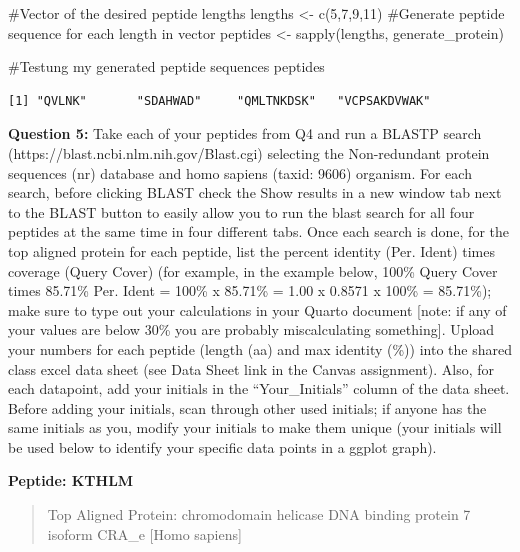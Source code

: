 \documentclass[
  letterpaper,
  DIV=11,
  numbers=noendperiod]{scrartcl}
\newenvironment{Shaded}{\begin{snugshade}}{\end{snugshade}}
\newcommand{\CommentTok}[1]{\textcolor[rgb]{0.37,0.37,0.37}{#1}}
\newcommand{\DecValTok}[1]{\textcolor[rgb]{0.68,0.00,0.00}{#1}}
\newcommand{\FunctionTok}[1]{\textcolor[rgb]{0.28,0.35,0.67}{#1}}
\newcommand{\NormalTok}[1]{\textcolor[rgb]{0.00,0.23,0.31}{#1}}
\newcommand{\OtherTok}[1]{\textcolor[rgb]{0.00,0.23,0.31}{#1}}
\begin{document}
\begin{Shaded}
\begin{Highlighting}[]
\CommentTok{\#Vector of the desired peptide lengths }
\NormalTok{lengths }\OtherTok{\textless{}{-}} \FunctionTok{c}\NormalTok{(}\DecValTok{5}\NormalTok{,}\DecValTok{7}\NormalTok{,}\DecValTok{9}\NormalTok{,}\DecValTok{11}\NormalTok{)}
\CommentTok{\#Generate peptide sequence for each length in vector}
\NormalTok{peptides }\OtherTok{\textless{}{-}} \FunctionTok{sapply}\NormalTok{(lengths, generate\_protein)}

\CommentTok{\#Testung my generated peptide sequences}
\NormalTok{peptides}
\end{Highlighting}
\end{Shaded}

\begin{verbatim}
[1] "QVLNK"       "SDAHWAD"     "QMLTNKDSK"   "VCPSAKDVWAK"
\end{verbatim}

\textbf{Question 5:} Take each of your peptides from Q4 and run a BLASTP
search (https://blast.ncbi.nlm.nih.gov/Blast.cgi) selecting the
Non-redundant protein sequences (nr) database and homo sapiens (taxid:
9606) organism. For each search, before clicking BLAST check the Show
results in a new window tab next to the BLAST button to easily allow you
to run the blast search for all four peptides at the same time in four
different tabs. Once each search is done, for the top aligned protein
for each peptide, list the percent identity (Per. Ident) times coverage
(Query Cover) (for example, in the example below, 100\% Query Cover
times 85.71\% Per. Ident = 100\% x 85.71\% = 1.00 x 0.8571 x 100\% =
85.71\%); make sure to type out your calculations in your Quarto
document {[}note: if any of your values are below 30\% you are probably
miscalculating something{]}. Upload your numbers for each peptide
(length (aa) and max identity (\%)) into the shared class excel data
sheet (see Data Sheet link in the Canvas assignment). Also, for each
datapoint, add your initials in the ``Your\_Initials'' column of the
data sheet. Before adding your initials, scan through other used
initials; if anyone has the same initials as you, modify your initials
to make them unique (your initials will be used below to identify your
specific data points in a ggplot graph).

\textbf{Peptide: KTHLM}

\begin{quote}
Top Aligned Protein: chromodomain helicase DNA binding protein 7 isoform
CRA\_e {[}Homo sapiens{]}
\end{quote}
\end{document}
